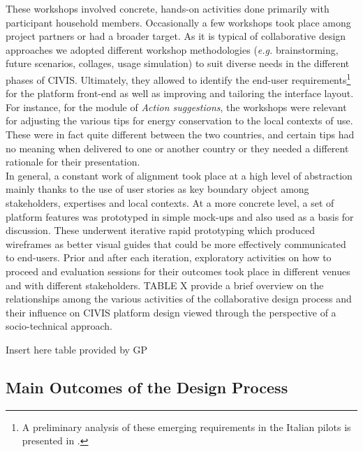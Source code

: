 These workshops involved concrete, hands-on activities done primarily with participant household members.
Occasionally a few workshops took place among project partners or had a broader target.
As it is typical of collaborative design approaches we adopted different workshop methodologies (\textit{e.g.} brainstorming, future scenarios,
collages, usage simulation) to suit diverse needs in the different phases of CIVIS.
Ultimately, they allowed to identify the end-user requirements\footnote{A preliminary analysis of these emerging requirements in the Italian pilots
is presented in \cite{capaccioli_participatory_2016}.} for the platform front-end as well as
improving and tailoring the interface layout.
% 
For instance, for the module of \textit{Action suggestions}, the workshops were relevant for adjusting the various
tips for energy conservation to the local contexts of use. These were in fact quite different between the two countries,
 and certain tips had no meaning when delivered to one or another country or they needed a different
 rationale for their presentation.\\
 
In general, a constant work of alignment took place at a high level of abstraction mainly thanks to
the use of user stories as key boundary object among stakeholders,
expertises and local contexts.
At a more concrete level, a set of platform features was prototyped in simple mock-ups
and also used as a basis for discussion. These underwent iterative rapid prototyping which
produced wireframes as better visual guides that could be more effectively communicated to end-users.
Prior and after each iteration, exploratory activities on how to proceed and evaluation sessions for their outcomes took place in different venues and with different stakeholders.
TABLE X provide a brief overview on the relationships among the various activities of the collaborative design process and their influence on CIVIS platform design viewed through the perspective of a socio-technical approach. 

\begin{svgraybox}
Insert here table provided by GP
\end{svgraybox}

\subsection{Main Outcomes of the Design Process} %



